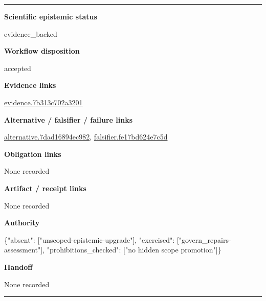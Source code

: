 \documentclass[10pt,a4paper]{article}
\newcommand{\TraceField}[2]{\par\noindent\textbf{#1}\par\noindent #2\par\smallskip}
\newenvironment{TraceDossier}{\par\medskip\noindent\hrule\medskip}{\medskip\hrule\par\medskip}
\begin{document}
\begin{TraceDossier}
\TraceField{Scientific epistemic status}{evidence\_\allowbreak{}backed}

\TraceField{Workflow disposition}{accepted}

\TraceField{Evidence links}{\hyperlink{trace-evidence-a012744e23ca734883}{evidence.\allowbreak{}7b313c702a\allowbreak{}3201}}

\TraceField{Alternative / falsifier / failure links}{\hyperlink{trace-alternative-acc19cc59923fbfea3}{alternativ\allowbreak{}e.\allowbreak{}7dad16894e\allowbreak{}c982}, \hyperlink{trace-alternative-fc8a78316ae01c3d9f}{falsifier.\allowbreak{}fe17bd624e\allowbreak{}7c5d}}

\TraceField{Obligation links}{None recorded}

\TraceField{Artifact / receipt links}{None recorded}

\TraceField{Authority}{\{"absent":\allowbreak{} ["unscoped\allowbreak{}-\allowbreak{}epistemic-\allowbreak{}upgrade"],\allowbreak{} "exercised\allowbreak{}":\allowbreak{} ["govern\_\allowbreak{}repairs-\allowbreak{}assessment\allowbreak{}"], "prohibiti\allowbreak{}ons\_\allowbreak{}checked":\allowbreak{} ["no hidden scope promotion"\allowbreak{}]\}}

\TraceField{Handoff}{None recorded}

\end{TraceDossier}
\end{document}
